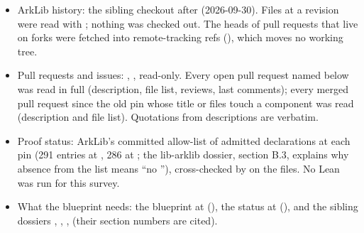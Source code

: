 \begin{itemize}
\item ArkLib history: the sibling checkout 
  after  (2026-09-30). Files at a revision were read with
  ; nothing was checked out. The heads of pull requests that live on
  forks were fetched into remote-tracking refs
  (), which moves no
  working tree.
\item Pull requests and issues: , , read-only.
  Every open pull request named below was read in full (description, file list, reviews, last
  comments); every merged pull request since the old pin whose title or files touch a component
  was read (description and file list). Quotations from descriptions are verbatim.
\item Proof status: ArkLib's committed allow-list of admitted declarations
   at each pin (291 entries at , 286 at
  ; the lib-arklib dossier, section B.3, explains why absence from the list means
  ``no ''), cross-checked by  on the files. No Lean was run for
  this survey.
\item What the blueprint needs: the blueprint at  (), the status at
   (), and the sibling dossiers ,
  , ,  (their section
  numbers are cited).
\end{itemize}

